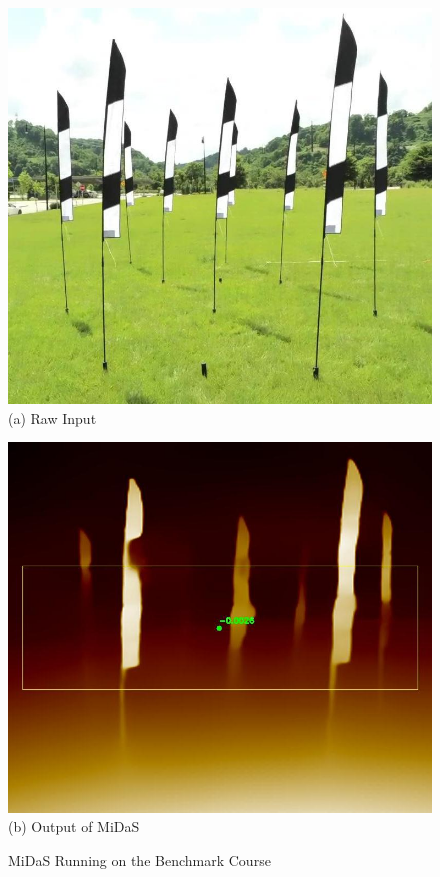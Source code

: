 \begin{figure}
	\begin{minipage}{0.495\linewidth}
		\centering
		\includegraphics[width=0.8\linewidth]{chapter6/FIGS/fig-obstacle-course-drone-pov.jpg}\\
		{(a) Raw Input}\\
	\end{minipage}
	\begin{minipage}{0.495\linewidth}
		\centering
		\includegraphics[width=0.8\linewidth]{chapter6/FIGS/fig-obstacle-course-midas.jpg}\\
		{(b) Output of MiDaS}\\
	\end{minipage}
\caption{MiDaS Running on the Benchmark Course}
\label{fig:midas-sample-course}
\end{figure}

